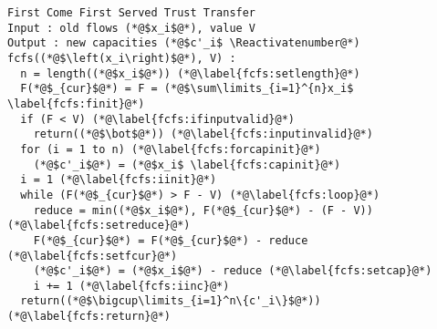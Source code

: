 \Suppressnumber
\begin{lstlisting}[label=fcfs, style=numbers]
First Come First Served Trust Transfer
Input : old flows (*@$x_i$@*), value V
Output : new capacities (*@$c'_i$ \Reactivatenumber@*)
fcfs((*@$\left(x_i\right)$@*), V) :
  n = length((*@$x_i$@*)) (*@\label{fcfs:setlength}@*)
  F(*@$_{cur}$@*) = F = (*@$\sum\limits_{i=1}^{n}x_i$ \label{fcfs:finit}@*)
  if (F < V) (*@\label{fcfs:ifinputvalid}@*)
    return((*@$\bot$@*)) (*@\label{fcfs:inputinvalid}@*)
  for (i = 1 to n) (*@\label{fcfs:forcapinit}@*)
    (*@$c'_i$@*) = (*@$x_i$ \label{fcfs:capinit}@*)
  i = 1 (*@\label{fcfs:iinit}@*)
  while (F(*@$_{cur}$@*) > F - V) (*@\label{fcfs:loop}@*)
    reduce = min((*@$x_i$@*), F(*@$_{cur}$@*) - (F - V)) (*@\label{fcfs:setreduce}@*)
    F(*@$_{cur}$@*) = F(*@$_{cur}$@*) - reduce (*@\label{fcfs:setfcur}@*)
    (*@$c'_i$@*) = (*@$x_i$@*) - reduce (*@\label{fcfs:setcap}@*)
    i += 1 (*@\label{fcfs:iinc}@*)
  return((*@$\bigcup\limits_{i=1}^n\{c'_i\}$@*)) (*@\label{fcfs:return}@*)
\end{lstlisting}
